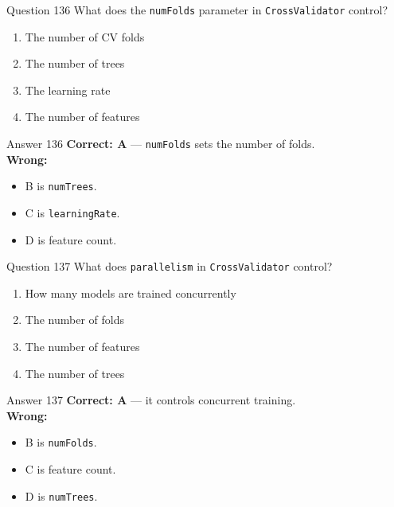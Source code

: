 \documentclass[aspectratio=169,11pt]{beamer}
\begin{document}
	\begin{frame}{Question 136}
		What does the \texttt{numFolds} parameter in \texttt{CrossValidator} control?
		\begin{enumerate}[label=\Alph*.]
			\item The number of CV folds
			\item The number of trees
			\item The learning rate
			\item The number of features
		\end{enumerate}
	\end{frame}
	\begin{frame}{Answer 136}
		\textbf{Correct: A} --- \texttt{numFolds} sets the number of folds.\\
		\vspace{0.5em}
		\textbf{Wrong:}
		\begin{itemize}
			\item B is \texttt{numTrees}.
			\item C is \texttt{learningRate}.
			\item D is feature count.
		\end{itemize}
	\end{frame}
	
	\begin{frame}{Question 137}
		What does \texttt{parallelism} in \texttt{CrossValidator} control?
		\begin{enumerate}[label=\Alph*.]
			\item How many models are trained concurrently
			\item The number of folds
			\item The number of features
			\item The number of trees
		\end{enumerate}
	\end{frame}
	\begin{frame}{Answer 137}
		\textbf{Correct: A} --- it controls concurrent training.\\
		\vspace{0.5em}
		\textbf{Wrong:}
		\begin{itemize}
			\item B is \texttt{numFolds}.
			\item C is feature count.
			\item D is \texttt{numTrees}.
		\end{itemize}
	\end{frame}
	
\end{document}
